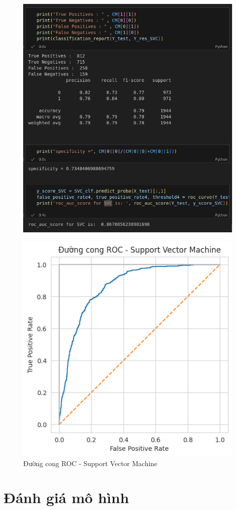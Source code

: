 \documentclass[11pt]{article}
\begin{document}
	\begin{figure}[H]
		\centering
		\includegraphics[width=0.7\linewidth]{SVC/screenshot011}
		\caption{}
		\label{fig:screenshot011}
	\end{figure}
	
	\begin{figure}[H]
		\centering
		\includegraphics[width=0.7\linewidth]{SVC/DuongCongROC}
		\caption{Đường cong ROC - Support Vector Machine}
		\label{fig:duongcongroc}
	\end{figure}
	
	\section{Đánh giá mô hình}
	
\end{document}
